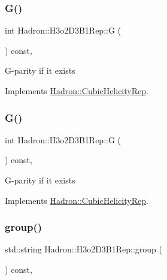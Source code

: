 \subsubsection{\texorpdfstring{G()}{G()}\hspace{0.1cm}{\footnotesize\ttfamily [1/2]}}
{\footnotesize\ttfamily int Hadron\+::\+H3o2\+D3\+B1\+Rep\+::G (\begin{DoxyParamCaption}{ }\end{DoxyParamCaption}) const\hspace{0.3cm}{\ttfamily [inline]}, {\ttfamily [virtual]}}

G-\/parity if it exists 

Implements \mbox{\hyperlink{structHadron_1_1CubicHelicityRep_a50689f42be1e6170aa8cf6ad0597018b}{Hadron\+::\+Cubic\+Helicity\+Rep}}.

\mbox{\label{structHadron_1_1H3o2D3B1Rep_a24c53ccee9b283bf35da7d7f7a75a88f}} 
\subsubsection{\texorpdfstring{G()}{G()}\hspace{0.1cm}{\footnotesize\ttfamily [2/2]}}
{\footnotesize\ttfamily int Hadron\+::\+H3o2\+D3\+B1\+Rep\+::G (\begin{DoxyParamCaption}{ }\end{DoxyParamCaption}) const\hspace{0.3cm}{\ttfamily [inline]}, {\ttfamily [virtual]}}

G-\/parity if it exists 

Implements \mbox{\hyperlink{structHadron_1_1CubicHelicityRep_a50689f42be1e6170aa8cf6ad0597018b}{Hadron\+::\+Cubic\+Helicity\+Rep}}.

\mbox{\label{structHadron_1_1H3o2D3B1Rep_a0839d8685752d851d9175eb3cfb568d7}} 
\subsubsection{\texorpdfstring{group()}{group()}\hspace{0.1cm}{\footnotesize\ttfamily [1/3]}}
{\footnotesize\ttfamily std\+::string Hadron\+::\+H3o2\+D3\+B1\+Rep\+::group (\begin{DoxyParamCaption}{ }\end{DoxyParamCaption}) const\hspace{0.3cm}{\ttfamily [inline]}, {\ttfamily [virtual]}}


